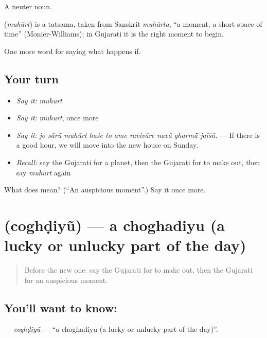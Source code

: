 A neuter noun.

\begin{cousinweb}
\textbf{} (\emph{muhūrt}) is a tatsama, taken from Sanskrit \emph{muhūrta}, \textquotedblleft{}a moment, a short space of time\textquotedblright{} (Monier-Williams); in Gujarati it is the right moment to begin.
\end{cousinweb}

\begin{grammarlens}[title={What you've built}]
One more word for saying what happens if.
\end{grammarlens}

\subsection*{Your turn}
\begin{itemize}
\raggedright
  \item \emph{Say it:} \emph{muhūrt}
  \item \emph{Say it:} \emph{muhūrt}, once more
  \item \emph{Say it:} \emph{jo sārũ muhūrt haśe to ame ravivāre navā gharmā̃ jaīśũ.} — If there is a good hour, we will move into the new house on Sunday.
  \item \emph{Recall:} say the Gujarati for a planet, then the Gujarati for to make out, then say \emph{muhūrt} again
\end{itemize}

\begin{tcolorbox}[breakable,colback=teal!4,colframe=teal!35!black,title={Before you move on}]
What does  mean? (\textquotedblleft{}An auspicious moment\textquotedblright{}.) Say it once more.
\end{tcolorbox}
\section[\texorpdfstring{\gu{ચોઘડિયું} (coghḍiyũ)}{ચોઘડિયું (coghḍiyũ)}]{ (coghḍiyũ) — a choghadiyu (a lucky or unlucky part of the day)}

\label{lesson:GU-C536-coghdiyu}



\begin{quote}
Before the new one: say the Gujarati for to make out, then the Gujarati for an auspicious moment.
\end{quote}

\subsection*{You'll want to know: }
\textbf{} — \emph{coghḍiyũ} — \textquotedblleft{}a choghadiyu (a lucky or unlucky part of the day)\textquotedblright{}.

